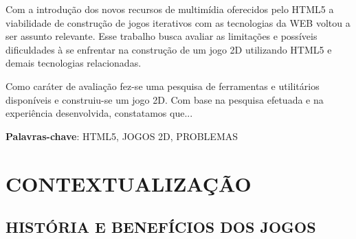 \documentclass{article}
\begin{document}
Com a introdução dos novos recursos de multimídia oferecidos pelo HTML5 a viabilidade de construção de jogos iterativos com as tecnologias da WEB voltou a ser assunto relevante. Esse trabalho busca avaliar as limitações e possíveis dificuldades à se enfrentar na construção de um jogo 2D utilizando HTML5 e demais tecnologias relacionadas.

Como caráter de avaliação fez-se uma pesquisa de ferramentas e utilitários disponíveis e construiu-se um jogo 2D. Com base na pesquisa efetuada e na experiência desenvolvida, constatamos que...


\textbf{Palavras-chave}: HTML5, JOGOS 2D, PROBLEMAS

\newpage

\listoffigures
\listoftables
\newpage

\tableofcontents
\newpage

\section{CONTEXTUALIZAÇÃO}
\subsection{HISTÓRIA E BENEFÍCIOS DOS JOGOS}
\end{document}
